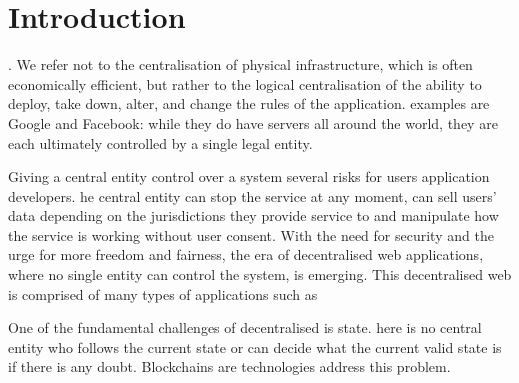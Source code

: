 \section{Introduction}\label{sec:intro}
. We refer not to the centralisation of physical infrastructure, which is often economically efficient, but rather to the logical centralisation of the ability to deploy, take down, alter, and change the rules of the application.
 examples are Google and Facebook: while they do have servers all around the world, they are each ultimately controlled by a single legal entity.

Giving a central entity control over a system  several risks for users  application developers.
he central entity can stop the service at any moment, can sell users' data depending on the jurisdictions they provide service to and manipulate how the service is working without user consent.
With the need for security and the urge for more freedom and fairness, the era of decentralised web applications, where no single entity can control the system, is emerging.
This decentralised web is comprised of many types of applications such as 

One of the fundamental challenges of  decentralised  is  state. here is no central entity who follows the current state or can decide what the current valid state is if there is any doubt. Blockchains are  technologies  address this problem.

